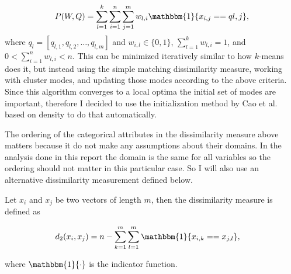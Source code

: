 \documentclass[result.tex]{subfiles}
\begin{document}
\begin{align*}
P(W, Q) = \sum_{l=1}^{k} \sum_{i=1}^{n} \sum_{j=1}^{m} w_{l,i} \mathbbm{1} \{ x_{i,j} == q{l, j} \},
\end{align*}
where $q_{l} = \left[ q_{l,1}, q_{l,2}, \ldots, q_{l, m} \right]$ and $w_{i, l} \in \{ 0, 1 \}$, $\sum_{l=1}^{k} w_{l,i} = 1$, and $0 < \sum_{i=1}^{n} w_{l,i} < n$. This can be minimized iteratively similar to how $k$-means does it, but instead using the simple matching dissimilarity measure, working with cluster modes, and updating those modes according to the above criteria. Since this algorithm converges to a local optima the initial set of modes are important, therefore I decided to use the initialization method by Cao et al. \cite{cao2009new} based on density to do that automatically.

The ordering of the categorical attributes in the dissimilarity measure above matters because it do not make any assumptions about their domains. In the analysis done in this report the domain is the same for all variables so the ordering should not matter in this particular case. So I will also use an alternative dissimilarity measurement defined below.

Let $x_i$ and $x_j$ be two vectors of length $m$, then the dissimilarity measure is defined as

\begin{align*}
d_2(x_i, x_j) &= n - \sum_{k=1}^{m} \sum_{l=1}^{m} \mathbbm{1} \{ x_{i, k} == x_{j, l} \},
\end{align*}

where $\mathbbm{1} \{ \cdot \}$ is the indicator function.
\end{document}
